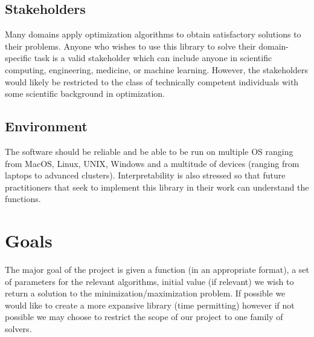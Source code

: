 \documentclass{article}
\begin{document}
\subsection{Stakeholders}
Many domains apply optimization algorithms to obtain satisfactory solutions to their problems. Anyone who wishes to use this library to solve their domain-specific task is a valid stakeholder which can include anyone in scientific computing, engineering, medicine, or machine learning. However, the stakeholders would likely be restricted to the class of technically competent individuals with some scientific background in optimization. 
\subsection{Environment}
 The software should be reliable and be able to be run on multiple OS ranging from MacOS, Linux, UNIX, Windows and a multitude of devices (ranging from laptops to advanced clusters). Interpretability is also stressed so that future practitioners that seek to implement this library in their work can understand the functions. 

\section{Goals}
The major goal of the project is given a function (in an appropriate format), a set of parameters for the relevant algorithms, initial value (if relevant) we wish to return a solution to the minimization/maximization problem. If possible we would like to create a more expansive library (time permitting) however if not possible we may choose to restrict the scope of our project to one family of solvers.
\end{document}
